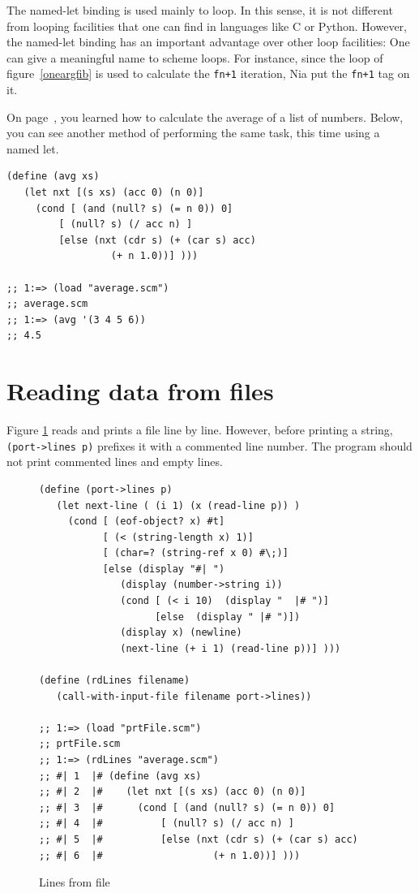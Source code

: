 \documentclass[a4paper,12pt]{book}
\begin{document}
The named-let binding is used mainly
to loop. In this sense, it is not
different from looping facilities
that one can find in languages like C
or Python. However, the named-let
binding has an important advantage
over other loop facilities: One can
give a meaningful 
name
to scheme loops.
For instance, since the loop of
figure~\ref{oneargfib} is used 
to calculate the \verb|fn+1| iteration,
Nia put the \verb|fn+1| tag on it.

On page~\pageref{sec:average}, you learned how to
calculate the average of a list of numbers. Below,
you can see another method of performing the
same task, this time using a named let.

\begin{verbatim}
(define (avg xs)
   (let nxt [(s xs) (acc 0) (n 0)]
     (cond [ (and (null? s) (= n 0)) 0]
         [ (null? s) (/ acc n) ]
         [else (nxt (cdr s) (+ (car s) acc)
                  (+ n 1.0))] )))

;; 1:=> (load "average.scm")
;; average.scm
;; 1:=> (avg '(3 4 5 6))
;; 4.5
\end{verbatim}

\section{Reading data from files}

Figure \ref{rdFile} reads and prints a file line by line.
However, before printing a string, \verb|(port->lines p)|
prefixes it with a commented line number. The program should
not print commented lines and empty lines.

\begin{figure}[!h]
\begin{verbatim}
(define (port->lines p)
   (let next-line ( (i 1) (x (read-line p)) )
     (cond [ (eof-object? x) #t]
           [ (< (string-length x) 1)]
           [ (char=? (string-ref x 0) #\;)]
           [else (display "#| ")
              (display (number->string i))
              (cond [ (< i 10)  (display "  |# ")]
                    [else  (display " |# ")])
              (display x) (newline)
              (next-line (+ i 1) (read-line p))] ))) 

(define (rdLines filename)
   (call-with-input-file filename port->lines))

;; 1:=> (load "prtFile.scm")
;; prtFile.scm
;; 1:=> (rdLines "average.scm")
;; #| 1  |# (define (avg xs)
;; #| 2  |#    (let nxt [(s xs) (acc 0) (n 0)]
;; #| 3  |#      (cond [ (and (null? s) (= n 0)) 0]
;; #| 4  |#          [ (null? s) (/ acc n) ]
;; #| 5  |#          [else (nxt (cdr s) (+ (car s) acc)
;; #| 6  |#                   (+ n 1.0))] )))
\end{verbatim}

\caption{Lines from file}
\label{rdFile}
\end{figure}
\end{document}
